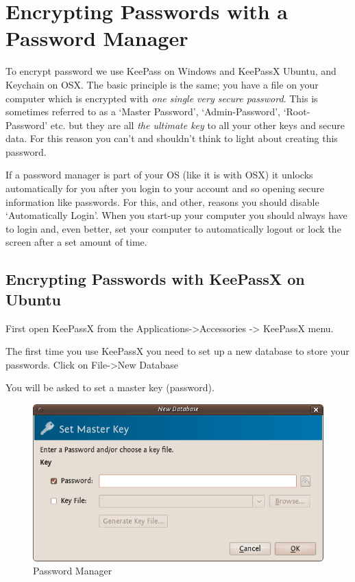 \section{Encrypting Passwords with a Password Manager}

To encrypt password we use KeePass on Windows and KeePassX Ubuntu, and
Keychain on OSX. The basic principle is the same; you have a file on
your computer which is encrypted with \emph{one single very secure
password}. This is sometimes referred to as a `Master Password',
`Admin-Password', `Root-Password' etc. but they are all \emph{the
ultimate key} to all your other keys and secure data. For this reason
you can't and shouldn't think to light about creating this password.

If a password manager is part of your OS (like it is with OSX) it
unlocks automatically for you after you login to your account and so
opening secure information like passwords. For this, and other, reasons
you should disable `Automatically Login'. When you start-up your
computer you should always have to login and, even better, set your
computer to automatically logout or lock the screen after a set amount
of time.

\subsection{Encrypting Passwords with KeePassX on Ubuntu}

First open KeePassX from the Applications-\textgreater{}Accessories
-\textgreater{} KeePassX menu.

The first time you use KeePassX you need to set up a new database to
store your passwords. Click on File-\textgreater{}New Database

You will be asked to set a master key (password).

\begin{figure}[htbp]
\centering
\includegraphics{mng_1.png}
\caption{Password Manager}
\end{figure}


